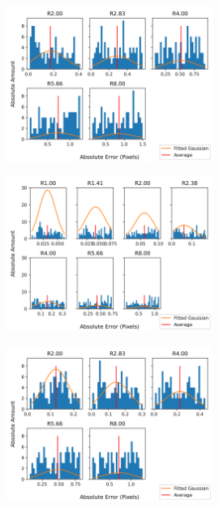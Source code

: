 \documentclass[aps,pra,a4paper,nofootinbib,onecolumn,tightenlines,longbibliography,12pt,amsfonts,amssymb,amsmath,floatfix]{revtex4-2} %
\begin{document}
  \begin{figure}[H]
    \begin{center}
      \includegraphics[width=0.6\textwidth]{project_pics/noise_cen_scatter_5.png}
    \end{center}
    \caption{}
    \label{fig:box_5_noise}
  \end{figure}

  \begin{figure}[H]
    \begin{center}
      \includegraphics[width=0.6\textwidth]{project_pics/distro_centriod_7.png}
    \end{center}
    \caption{}
    \label{fig:box_7}
  \end{figure}

  \begin{figure}[H]
    \begin{center}
      \includegraphics[width=0.6\textwidth]{project_pics/noise_cen_scatter_7.png}
    \end{center}
    \caption{}
    \label{fig:box_7_noise}
  \end{figure}
\end{document}
